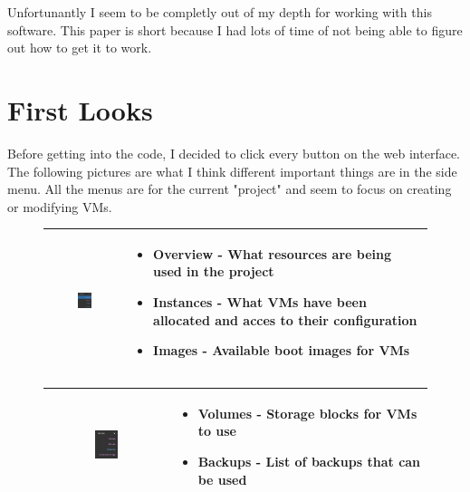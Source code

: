 \documentclass[12pt]{article}
\begin{document}
Unfortunantly I seem to be completly out of my depth for working with this software.
This paper is short because I had lots of time of not being able to figure out how to get it to work.

\newpage
\section{First Looks}

Before getting into the code, I decided to click every button on the web interface.
The following pictures are what I think different important things are in the side menu.
All the menus are for the current "project" and seem to focus on creating or modifying VMs.

\begin{figure} [ht]
	\centering
	\begin{tabular}{|c|p{}|}
		\hline
		\includegraphics[width=0.2\textwidth]{menu1.png} %
		&
		\begin{itemize}
			\vspace{-100pt}
			\item Overview - What resources are being used in the project
			\item Instances - What VMs have been allocated and acces to their configuration
			\item Images - Available boot images for VMs
		\end{itemize}
		\\ \hline
	\end{tabular}

	\begin{tabular}{|c|p{}|}
		\hline
		\includegraphics[width=0.2\textwidth]{menu2.png} %
		&
		\begin{itemize}
			\vspace{-100pt}
			\item Volumes - Storage blocks for VMs to use
			\item Backups - List of backups that can be used
		\end{itemize}
		\\ \hline
	\end{tabular}


\end{figure}
\end{document}
